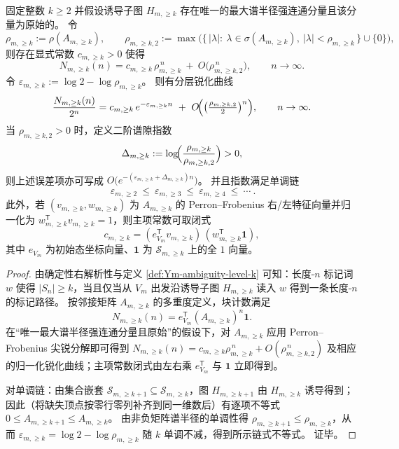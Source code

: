 \begin{theorem}\label{thm:Ym-ambiguity-spectrum-law}
固定整数 \(k\ge 2\) 并假设诱导子图 \(H_{m,\ge k}\) 存在唯一的最大谱半径强连通分量且该分量为原始的。
令
\[
\rho_{m,\ge k}:=\rho(A_{m,\ge k}),\qquad
\rho_{m,\ge k,2}:=\max\bigl(\{\,|\lambda|:\ \lambda\in\sigma(A_{m,\ge k}),\ |\lambda|<\rho_{m,\ge k}\,\}\cup\{0\}\bigr),
\]
则存在显式常数 \(c_{m,\ge k}>0\) 使得
\[
N_{m,\ge k}(n)=c_{m,\ge k}\,\rho_{m,\ge k}^{\,n}\ +\ O\!\bigl(\rho_{m,\ge k,2}^{\,n}\bigr),
\qquad n\to\infty.
\]
令 \(\varepsilon_{m,\ge k}:=\log 2-\log\rho_{m,\ge k}\)。
则有分层锐化曲线
\[
\frac{N_{m,\ge k}(n)}{2^n}
=c_{m,\ge k}\,e^{-\varepsilon_{m,\ge k} n}\ +\ O\!\Bigl(\bigl(\tfrac{\rho_{m,\ge k,2}}{2}\bigr)^{n}\Bigr),
\qquad n\to\infty.
\]
当 \(\rho_{m,\ge k,2}>0\) 时，定义二阶谱隙指数
\[
\Delta_{m,\ge k}:=\log\!\Bigl(\frac{\rho_{m,\ge k}}{\rho_{m,\ge k,2}}\Bigr)>0,
\]
则上述误差项亦可写成 \(O\!\bigl(e^{-(\varepsilon_{m,\ge k}+\Delta_{m,\ge k})n}\bigr)\)。
并且指数满足单调链
\[
\boxed{\ \varepsilon_{m,\ge 2}\ \le\ \varepsilon_{m,\ge 3}\ \le\ \varepsilon_{m,\ge 4}\ \le\ \cdots\ }.
\]
此外，若 \((v_{m,\ge k},w_{m,\ge k})\) 为 \(A_{m,\ge k}\) 的 Perron--Frobenius 右/左特征向量并归一化为 \(w_{m,\ge k}^{\mathsf T}v_{m,\ge k}=1\)，则主项常数可取闭式
\[
c_{m,\ge k}=(e_{V_m}^{\mathsf T}v_{m,\ge k})\,(w_{m,\ge k}^{\mathsf T}\mathbf 1),
\]
其中 \(e_{V_m}\) 为初始态坐标向量、\(\mathbf 1\) 为 \(\mathcal{S}_{m,\ge k}\) 上的全 \(1\) 向量。
\end{theorem}

\begin{proof}
由确定性右解析性与定义 \ref{def:Ym-ambiguity-level-k} 可知：长度-\(n\) 标记词 \(w\) 使得 \(|S_n|\ge k\)，当且仅当从 \(V_m\) 出发沿诱导子图 \(H_{m,\ge k}\) 读入 \(w\) 得到一条长度-\(n\) 的标记路径。
按邻接矩阵 \(A_{m,\ge k}\) 的多重度定义，块计数满足
\[
N_{m,\ge k}(n)=e_{V_m}^{\mathsf T}(A_{m,\ge k})^n\mathbf 1.
\]
在“唯一最大谱半径强连通分量且原始”的假设下，对 \(A_{m,\ge k}\) 应用 Perron--Frobenius 尖锐分解即可得到
\(
N_{m,\ge k}(n)=c_{m,\ge k}\rho_{m,\ge k}^{\,n}+O(\rho_{m,\ge k,2}^{\,n})
\)
及相应的归一化锐化曲线；主项常数闭式由左右乘 \(e_{V_m}^{\mathsf T}\) 与 \(\mathbf 1\) 立即得到。
\par
对单调链：由集合嵌套 \(\mathcal{S}_{m,\ge k+1}\subseteq\mathcal{S}_{m,\ge k}\)，图 \(H_{m,\ge k+1}\) 由 \(H_{m,\ge k}\) 诱导得到；
因此（将缺失顶点按零行零列补齐到同一维数后）有逐项不等式 \(0\le A_{m,\ge k+1}\le A_{m,\ge k}\)。
由非负矩阵谱半径的单调性得 \(\rho_{m,\ge k+1}\le \rho_{m,\ge k}\)，从而 \(\varepsilon_{m,\ge k}=\log 2-\log\rho_{m,\ge k}\) 随 \(k\) 单调不减，得到所示链式不等式。
证毕。
\end{proof}

